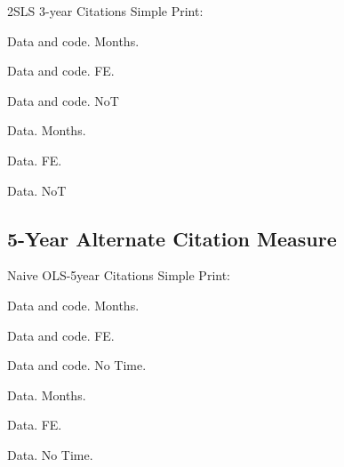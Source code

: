 \documentclass{beamer}
\begin{document}
\begin{frame}{}
\scalebox{0.3}{}
\end{frame}

\begin{frame}{2SLS 3-year Citations}
Simple Print:

Data and code. Months.

Data and code. FE.

Data and code. NoT

Data. Months.

Data. FE.

Data. NoT
\end{frame}

\begin{frame}{}
\scalebox{0.3}{}
\end{frame}

\begin{frame}{}
\scalebox{0.3}{}
\end{frame}

\begin{frame}{}
\scalebox{0.3}{}
\end{frame}

\begin{frame}{}
\scalebox{0.3}{}
\end{frame}

\begin{frame}{}
\scalebox{0.3}{}
\end{frame}

\begin{frame}{}
\scalebox{0.3}{}
\end{frame}

\subsection{5-Year Alternate Citation Measure}
\begin{frame}{Naive OLS-5year Citations}
Simple Print:

Data and code. Months.

Data and code. FE.

Data and code. No Time.

Data. Months.

Data. FE.

Data. No Time.
\end{frame}
\end{document}
